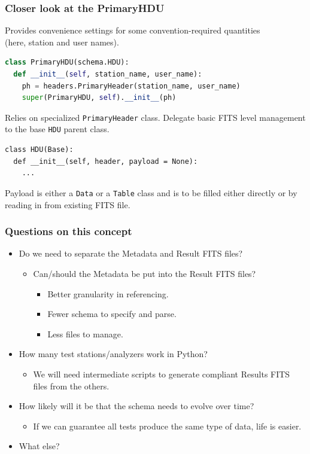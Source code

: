 \documentclass[bigger]{beamer}
\begin{document}
\begin{frame}[fragile]
  \frametitle{Closer look at the PrimaryHDU}

  Provides convenience settings for some convention-required quantities \\
  (here, station and user names).
  \begin{lstlisting}[language=Python]
class PrimaryHDU(schema.HDU):
  def __init__(self, station_name, user_name):
    ph = headers.PrimaryHeader(station_name, user_name)
    super(PrimaryHDU, self).__init__(ph)
  \end{lstlisting}

  Relies on specialized \texttt{PrimaryHeader} class.  Delegate basic
  FITS level management to the base \texttt{HDU} parent class.

  \begin{lstlisting}[langauge=Python]
class HDU(Base):
  def __init__(self, header, payload = None):
    ...      
  \end{lstlisting}

  Payload is either a \texttt{Data} or a \texttt{Table} class and is
  to be filled either directly or by reading in from existing FITS
  file.
\end{frame}


\begin{frame}
  \frametitle{Questions on this concept}
  \begin{itemize}
  \item Do we need to separate the Metadata and Result FITS files?
    \begin{itemize}
    \item Can/should the Metadata be put into the Result FITS files?
      \begin{itemize}
      \item Better granularity in referencing.
      \item Fewer schema to specify and parse.
      \item Less files to manage.
      \end{itemize}
    \end{itemize}
  \item How many test stations/analyzers work in Python?  
    \begin{itemize}
    \item We will need intermediate scripts to generate compliant
      Results FITS files from the others.
    \end{itemize}
  \item How likely will it be that the schema needs to evolve over
    time?
    \begin{itemize}
    \item If we can guarantee all tests produce the same type of data,
      life is easier.
    \end{itemize}
  \item What else?
  \end{itemize}
\end{frame}
\end{document}
